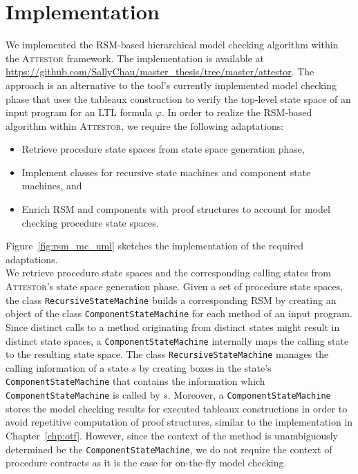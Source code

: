 \documentclass[a4paper, 12pt, twoside]{report}
\begin{document}
	\section{Implementation}
	
	We implemented the RSM-based hierarchical model checking algorithm within the \textsc{Attestor} framework. The implementation is available at \url{https://github.com/SallyChau/master_thesis/tree/master/attestor}. The approach is an alternative to the tool's currently implemented model checking phase that uses the tableaux construction to verify the top-level state space of an input program for an LTL formula $\varphi$. In order to realize the RSM-based algorithm within \textsc{Attestor}, we require the following adaptations:
	\begin{itemize}
		\item Retrieve procedure state spaces from state space generation phase,
		\item Implement classes for recursive state machines and component state machines, and
		\item Enrich RSM and components with proof structures to account for model checking procedure state spaces.
	\end{itemize}	
	
	Figure~\ref{fig:rsm_mc_uml} sketches the implementation of the required adaptations.\\

	We retrieve procedure state spaces and the corresponding calling states from \textsc{Attestor}'s state space generation phase. Given a set of procedure state spaces, the class \texttt{RecursiveStateMachine} builds a corresponding RSM by creating an object of the class \texttt{ComponentStateMachine} for each method of an input program. Since distinct calls to a method originating from distinct states might result in distinct state spaces, a \texttt{ComponentStateMachine} internally maps the calling state to the resulting state space. The class \texttt{RecursiveStateMachine} manages the calling information of a state $s$ by creating boxes in the state's \texttt{ComponentStateMachine} that contains the information which \texttt{ComponentStateMachine} is called by $s$. Moreover, a \texttt{ComponentStateMachine} stores the model checking results for executed tableaux constructions in order to avoid repetitive computation of proof structures, similar to the implementation in Chapter~\ref{chp:otf}. However, since the context of the method is unambiguously determined be the \texttt{ComponentStateMachine}, we do not require the context of procedure contracts as it is the case for on-the-fly model checking.\\
	
\end{document}
